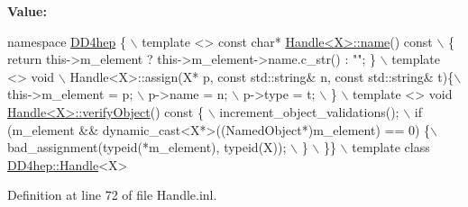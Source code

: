 {\bfseries Value\+:}
\begin{DoxyCode}
\textcolor{keyword}{namespace }\hyperlink{namespace_d_d4hep}{DD4hep} \{                                                    \(\backslash\)
    template <> \textcolor{keyword}{const} \textcolor{keywordtype}{char}* \hyperlink{class_d_d4hep_1_1_handle_a27c7d467a609ab32c133e1f3c7d85ef5}{Handle<X>::name}() const                      \(\backslash\)
    \{ \textcolor{keywordflow}{return} this->m\_element ? this->m\_element->name.c\_str() : \textcolor{stringliteral}{""}; \}    \(\backslash\)
    template <> void                                                    \(\backslash\)
    Handle<X>::assign(X* p, \textcolor{keyword}{const} std::string& n, \textcolor{keyword}{const} std::string& t)\{\(\backslash\)
      this->m\_element = p;                                              \(\backslash\)
      p->name = n;                                                      \(\backslash\)
      p->type = t;                                                      \(\backslash\)
    \}                                                                   \(\backslash\)
    template <> \textcolor{keywordtype}{void} \hyperlink{class_d_d4hep_1_1_handle_a0001c6eae622a62fb638a9e0a07ac150}{Handle<X>::verifyObject}()\textcolor{keyword}{ const     }\{               \(\backslash\)
      increment\_object\_validations();                                   \(\backslash\)
      if (m\_element && dynamic\_cast<X*>((NamedObject*)m\_element) == 0) \{\(\backslash\)
        bad\_assignment(\textcolor{keyword}{typeid}(*m\_element), \textcolor{keyword}{typeid}(X));                  \(\backslash\)
      \}                                                                 \(\backslash\)
    \}\}                                                                  \(\backslash\)
  template \textcolor{keyword}{class }\hyperlink{class_d_d4hep_1_1_handle}{DD4hep::Handle}<X>
\end{DoxyCode}


Definition at line 72 of file Handle.\+inl.

\hypertarget{_handle_8inl_ad861f1cd8d1e45907d1e481780fa99d2}{}\label{_handle_8inl_ad861f1cd8d1e45907d1e481780fa99d2} 
